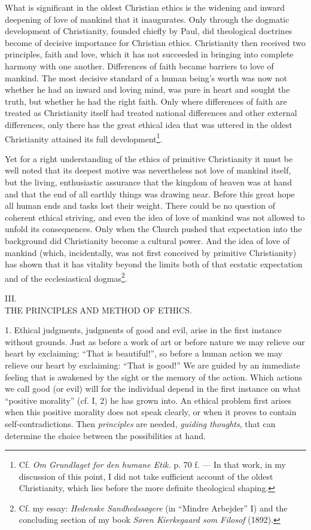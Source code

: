\documentclass[12pt,a4paper,openany]{book}
\newcommand{\opage}[1]{\marginnote{\footnotesize\textit{[#1]}}}
\newcounter{etikch}
\newcommand{\chapterhead}[2]{\stepcounter{etikch}\bigskip\begin{center}\pdfbookmark[1]{#1 #2}{etikch.\arabic{etikch}}#1\\[3pt]{\large #2}\end{center}\medskip}
\begin{document}
What is significant in the oldest Christian ethics is the widening and inward deepening of love of
mankind that it inaugurates. Only through the dogmatic development of Christianity, founded chiefly
by Paul, did theological doctrines become of decisive importance for Christian ethics. Christianity
then received two principles, faith and love, which it has not succeeded in bringing into complete
harmony with one another. Differences of faith became barriers to love of mankind. The most decisive
standard of a human being's worth was now not whether he had an inward and loving mind, was pure in
heart and sought the truth, but whether he had the right faith. Only where differences of faith are
treated as Christianity itself had treated national differences and other external differences, only
there has the great ethical idea that was uttered in the oldest Christianity attained its full
development\footnote[1]{Cf. \textit{Om Grundlaget for den humane Etik.} p. 70 f. --- In that work,
in my discussion of this point, I did not take sufficient account of the oldest Christianity, which
lies before the more definite theological shaping.}.

Yet for a right understanding of the ethics of primitive Christianity it must be well noted that its
deepest motive was nevertheless not love of mankind itself, but the living, enthusiastic assurance
that the kingdom of heaven was at hand and that the end of all earthly things was drawing near.
Before this great hope all human ends and tasks lost their weight. There could be no question of
coherent ethical striving, and even the idea of love of mankind was not allowed to unfold its
consequences. Only when the Church pushed that expectation into the background did Christianity
become a cultural power. And the idea of love of mankind (which,
\opage{22}incidentally, was not first conceived by primitive Christianity) has shown that it has vitality
beyond the limits both of that ecstatic expectation and of the ecclesiastical
dogmas\footnote[1]{Cf. my essay: \textit{Hedenske Sandhedssøgere} (in ``Mindre Arbejder'' I) and the
concluding section of my book \textit{Søren Kierkegaard som Filosof} (1892).}.

\chapterhead{III.}{THE PRINCIPLES AND METHOD OF ETHICS.}

1. Ethical judgments, judgments of good and evil, arise in the first instance without grounds. Just
as before a work of art or before nature we may relieve our heart by exclaiming: ``That is
beautiful!'', so before a human action we may relieve our heart by exclaiming: ``That is good!'' We
are guided by an immediate feeling that is awakened by the sight or the memory of the action. Which
actions we call good (or evil) will for the individual depend in the first instance on what
``positive morality'' (cf. I, 2) he has grown into. An ethical problem first arises when this
positive morality does not speak clearly, or when it proves to contain self-contradictions. Then
\textit{principles} are needed, \textit{guiding thoughts}, that can determine the choice between the
possibilities at hand.
\end{document}
